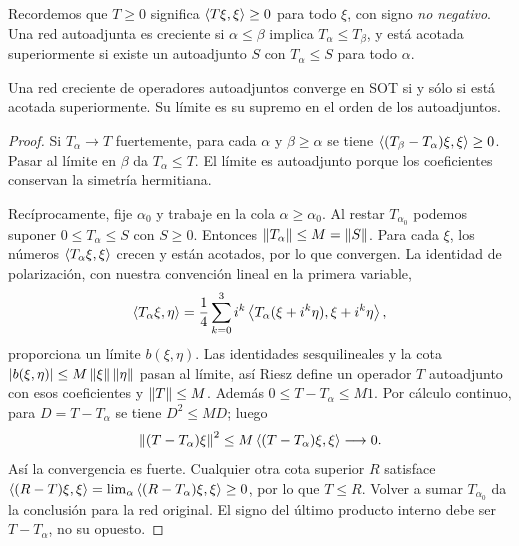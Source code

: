 Recordemos que $T\ge0$ significa $\left\langle T\xi,\xi\right\rangle\ge0$ para todo $\xi$, con signo \emph{no negativo}. Una red autoadjunta es creciente si $\alpha\le\beta$ implica $T_\alpha\le T_\beta$, y está acotada superiormente si existe un autoadjunto $S$ con $T_\alpha\le S$ para todo $\alpha$.

\begin{teorema}[Vigier]\label{v3:vigier}
Una red creciente de operadores autoadjuntos converge en SOT si y sólo si está acotada superiormente. Su límite es su supremo en el orden de los autoadjuntos.
\end{teorema}
\begin{proof}
Si $T_\alpha\to T$ fuertemente, para cada $\alpha$ y $\beta\ge\alpha$ se tiene $\left\langle(T_\beta-T_\alpha)\xi,\xi\right\rangle\ge0$. Pasar al límite en $\beta$ da $T_\alpha\le T$. El límite es autoadjunto porque los coeficientes conservan la simetría hermitiana.

Recíprocamente, fije $\alpha_0$ y trabaje en la cola $\alpha\ge\alpha_0$. Al restar $T_{\alpha_0}$ podemos suponer $0\le T_\alpha\le S$ con $S\ge0$. Entonces $\left\lVert T_\alpha\right\rVert\le M=\left\lVert S\right\rVert$. Para cada $\xi$, los números $\left\langle T_\alpha\xi,\xi\right\rangle$ crecen y están acotados, por lo que convergen. La identidad de polarización, con nuestra convención lineal en la primera variable,
\[
 \left\langle T_\alpha\xi,\eta\right\rangle
 =\frac14\sum_{k=0}^3 i^k\left\langle T_\alpha(\xi+i^k\eta),\xi+i^k\eta\right\rangle,
\]
proporciona un límite $b(\xi,\eta)$. Las identidades sesquilineales y la cota $|b(\xi,\eta)|\le M\left\lVert\xi\right\rVert\left\lVert\eta\right\rVert$ pasan al límite, así Riesz define un operador $T$ autoadjunto con esos coeficientes y $\left\lVert T\right\rVert\le M$. Además $0\le T-T_\alpha\le M1$. Por cálculo continuo, para $D=T-T_\alpha$ se tiene $D^2\le MD$; luego
\[
 \left\lVert(T-T_\alpha)\xi\right\rVert^2\le M\left\langle(T-T_\alpha)\xi,\xi\right\rangle\longrightarrow0.
\]
Así la convergencia es fuerte. Cualquier otra cota superior $R$ satisface $\left\langle(R-T)\xi,\xi\right\rangle=\lim_\alpha\left\langle(R-T_\alpha)\xi,\xi\right\rangle\ge0$, por lo que $T\le R$. Volver a sumar $T_{\alpha_0}$ da la conclusión para la red original. El signo del último producto interno debe ser $T-T_\alpha$, no su opuesto.
\end{proof}

